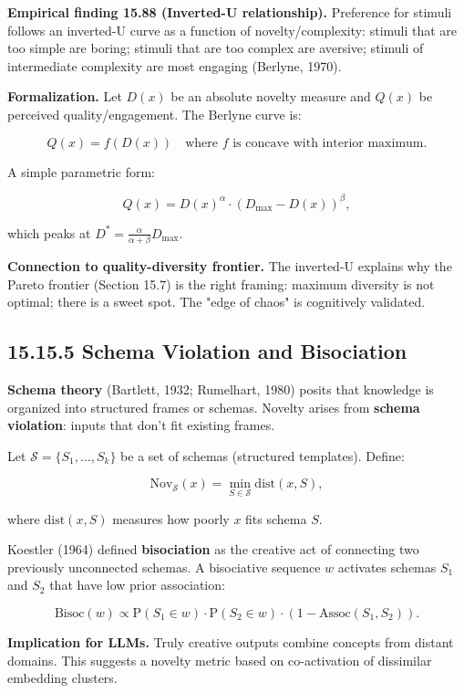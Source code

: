 \textbf{Empirical finding 15.88 (Inverted-U relationship).} Preference for stimuli follows an inverted-U curve as a function of novelty/complexity: stimuli that are too simple are boring; stimuli that are too complex are aversive; stimuli of intermediate complexity are most engaging (Berlyne, 1970).

\textbf{Formalization.} Let $D(x)$ be an absolute novelty measure and $Q(x)$ be perceived quality/engagement. The Berlyne curve is:

\[Q(x) = f(D(x)) \quad \text{where } f \text{ is concave with interior maximum}.\]

A simple parametric form:

\[Q(x) = D(x)^\alpha \cdot (D_{\max} - D(x))^\beta,\]

which peaks at $D^* = \frac{\alpha}{\alpha + \beta} D_{\max}$.

\textbf{Connection to quality-diversity frontier.} The inverted-U explains why the Pareto frontier (Section 15.7) is the right framing: maximum diversity is not optimal; there is a sweet spot. The "edge of chaos" is cognitively validated.

\subsection{15.15.5 Schema Violation and Bisociation}

\textbf{Schema theory} (Bartlett, 1932; Rumelhart, 1980) posits that knowledge is organized into structured frames or schemas. Novelty arises from \textbf{schema violation}: inputs that don't fit existing frames.

\begin{definition}
Let $\mathcal{S} = \{S_1, \ldots, S_k\}$ be a set of schemas (structured templates). Define:

\[\mathrm{Nov}_{\mathcal{S}}(x) = \min_{S \in \mathcal{S}} \mathrm{dist}(x, S),\]

where $\mathrm{dist}(x, S)$ measures how poorly $x$ fits schema $S$.

Koestler (1964) defined \textbf{bisociation} as the creative act of connecting two previously unconnected schemas. A bisociative sequence $w$ activates schemas $S_1$ and $S_2$ that have low prior association:

\[\mathrm{Bisoc}(w) \propto \mathrm{P}(S_1 \in w) \cdot \mathrm{P}(S_2 \in w) \cdot (1 - \mathrm{Assoc}(S_1, S_2)).\]

\textbf{Implication for LLMs.} Truly creative outputs combine concepts from distant domains. This suggests a novelty metric based on co-activation of dissimilar embedding clusters.
\end{definition}

